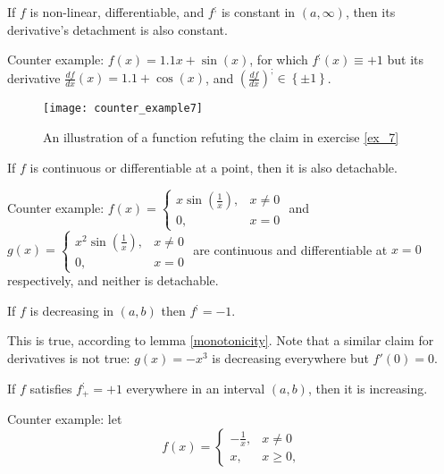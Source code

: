 \documentclass[11pt]{book}
\begin{document}
\begin{exercise}\label{ex_7}If $f$ is non-linear, differentiable, and $f^{;}$ is constant
in $\left(a,\infty\right)$, then its derivative's detachment is also
constant.
\end{exercise}

Counter example: $f\left(x\right)=1.1x+\sin\left(x\right)$, for
which $f^{;}\left(x\right)\equiv+1$ but its derivative $\frac{df}{dx}\left(x\right)=1.1+\cos\left(x\right)$,
and $\left(\frac{df}{dx}\right)^{;}\in\left\{ \pm1\right\} $.

\begin{figure}[h!]
\texttt{[image: counter\_example7]}
\label{counter_example7}
\caption{An illustration of a function refuting the claim in exercise \ref{ex_7}}
\end{figure}

\begin{exercise}If $f$ is continuous or differentiable at a point, then it is
also detachable.
\end{exercise}

Counter example: $f\left(x\right)=\begin{cases}
x\sin\left(\frac{1}{x}\right), & x\neq0\\
0, & x=0
\end{cases}$ and $g\left(x\right)=\begin{cases}
x^{2}\sin\left(\frac{1}{x}\right), & x\neq0\\
0, & x=0
\end{cases}$ are continuous and differentiable at $x=0$ respectively, and neither is detachable.

\begin{exercise}If $f$ is decreasing in $\left(a,b\right)$ then $f^{;}=-1$.
\end{exercise}

This is true, according to lemma \ref{monotonicity}.
Note that a similar claim for derivatives is not true: $g\left(x\right)=-x^{3}$
is decreasing everywhere but $f'\left(0\right)=0$.

\begin{exercise}\label{ex_10}If $f$ satisfies $f_{+}^{;}=+1$ everywhere in an interval $\left(a,b\right)$,
then it is increasing.
\end{exercise}

Counter example: let
\[
f\left(x\right)=\begin{cases}
-\frac{1}{x}, & x\neq0\\
x, & x\geq0,
\end{cases}
\]
\end{document}
